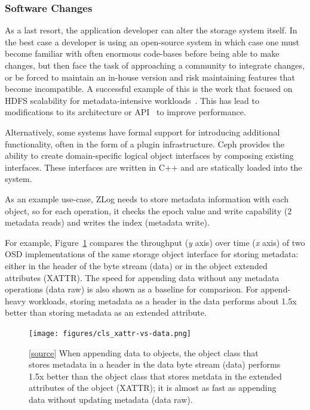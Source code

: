 \documentclass[10pt,twocolumn]{article}
\begin{document}
\subsubsection{Software Changes}\label{software-changes}

As a last resort, the application developer can alter the storage system
itself. In the best case a developer is using an open-source system in which
case one must become familiar with often enormous code-bases before being able
to make changes, but then face the task of approaching a community to
integrate changes, or be forced to maintain an in-house version and risk
maintaining features that become incompatible.  A successful example of this
is the work that focused on HDFS scalability for metadata-intensive workloads~\cite{shvachko_hdfs_2010}. This has lead to modifications to its
architecture or API~\cite{balmin:sigmod2012-clydesdale} to improve
performance.

Alternatively, some systems have formal support for introducing additional
functionality, often in the form of a plugin infrastructure. Ceph provides the
ability to create domain-specific logical object interfaces by composing
existing interfaces. These interfaces are written in C++ and are statically
loaded into the system. %

As an example use-case, ZLog needs to
store metadata information with each object, so for each operation, it
checks the epoch value and write capability (2 metadata reads) and
writes the index (metadata write).
\fi

For example, Figure~\ref{fig:datavsxattr} compares the throughput
(\emph{y} axis) over time (\emph{x} axis) of two OSD implementations of the same storage object interface for
storing metadata: either in the header of the byte stream (data) or in the
object extended attributes (XATTR). The speed for appending data without
any metadata operations (data raw) is also shown as a baseline for
comparison. For append-heavy workloads, storing metadata as a header in
the data performs about 1.5x better than storing metadata as an extended
attribute.

\begin{figure}[htbp]
\centering
\texttt{[image: figures/cls\_xattr-vs-data.png]}
\caption{{[}\href{https://github.com/michaelsevilla/malacology-popper/blob/master/experiments/figure1/visualize.ipynb}{source}{]}
When appending data to objects, the object class that stores metadata in
a header in the data byte stream (data) performs 1.5x better than the
object class that stores metdata in the extended attributes of the
object (XATTR); it is almost as fast as appending data without updating
metadata (data raw).}
\label{fig:datavsxattr}
\end{figure}
\end{document}
